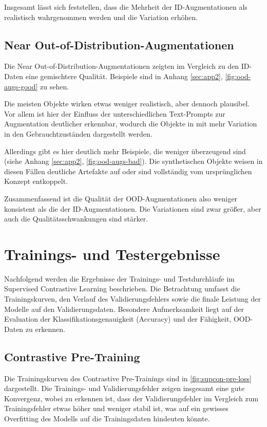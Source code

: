 Insgesamt lässt sich feststellen, dass die Mehrheit der ID-Augmentationen als realistisch wahrgenommen werden und die Variation erhöhen.

\subsection{Near Out-of-Distribution-Augmentationen} \label{subsec:da-fusion-ood-results}

Die Near Out-of-Distribution-Augmentationen zeigten im Vergleich zu den ID-Daten eine gemischtere Qualität. Beispiele sind in Anhang \ref{sec:app2}, \autoref{fig:ood-augs-good} zu sehen.

Die meisten Objekte wirken etwas weniger realistisch, aber dennoch plausibel. Vor allem ist hier der Einfluss der unterschiedlichen Text-Prompts zur Augmentation deutlicher erkennbar, wodurch die Objekte in mit mehr Variation in den Gebrauchtzuständen dargestellt werden.

Allerdings gibt es hier deutlich mehr Beispiele, die weniger überzeugend sind (siehe Anhang \ref{sec:app2}, \autoref{fig:ood-augs-bad}). Die synthetischen Objekte weisen in diesen Fällen deutliche Artefakte auf oder sind vollständig vom ursprünglichen Konzept entkoppelt.

Zusammenfassend ist die Qualität der OOD-Augmentationen also weniger konsistent als die der ID-Augmentationen. Die Variationen sind zwar größer, aber auch die Qualitätsschwankungen sind stärker.

\section{Trainings- und Testergebnisse} \label{sec:supcon-results}

Nachfolgend werden die Ergebnisse der Trainings- und Testdurchläufe im Supervised Contrastive Learning beschrieben. Die Betrachtung umfasst die Trainingskurven, den Verlauf des Validierungsfehlers sowie die finale Leistung der Modelle auf den Validierungsdaten. Besondere Aufmerksamkeit liegt auf der Evaluation der Klassifikationsgenauigkeit (Accuracy) und der Fähigkeit, OOD-Daten zu erkennen.

\subsection{Contrastive Pre-Training} \label{subsec:supcon-pre-results}

Die Trainingskurven des Contrastive Pre-Trainings sind in \autoref{fig:supcon-pre-loss} dargestellt. Die Trainings- und Validierungsfehler zeigen insgesamt eine gute Konvergenz, wobei zu erkennen ist, dass der Validierungsfehler im Vergleich zum Trainingsfehler etwas höher und weniger stabil ist, was auf ein gewisses Overfitting des Modells auf die Trainingsdaten hindeuten könnte.

